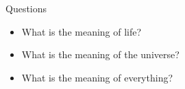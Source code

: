 \documentclass[10pt,xcolor=table]{beamer}
\begin{document}
    \begin{frame}{Questions}
        \begin{itemize}
            \item What is the meaning of life?
            \item What is the meaning of the universe?
            \item What is the meaning of everything?
        \end{itemize}
    \end{frame}
\end{document}
